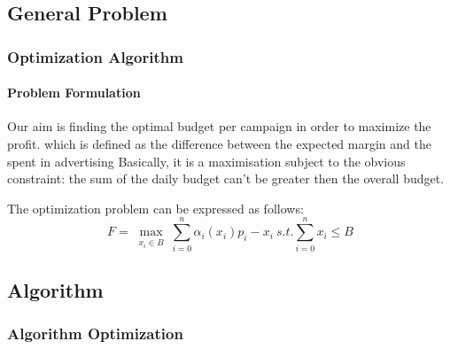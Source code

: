 \documentclass[11pt]{beamer}
\begin{document}

\subsection{General Problem}


\begin{frame}

\frametitle{Optimization Algorithm}
\framesubtitle{Problem Formulation}


Our aim is finding the optimal budget per campaign in order to maximize the profit.
which is defined as the difference between the expected margin and the spent in advertising
Basically, it is a maximisation subject to the obvious constraint: the sum of the daily budget can't be greater then the overall budget.

The optimization problem can be expressed as follows:
\begin{displaymath}
F=\max_{\substack{x_i\in B}} \sum_{i=0}^n \alpha_i(x_i)p_i-x_i \ s.t. \sum_{i=0}^n x_i\leq B
\end{displaymath}

\end{frame}


\subsection{Algorithm}


\begin{frame}

\frametitle{}
\framesubtitle{}

\end{frame}


\begin{frame}

\frametitle{Algorithm Optimization}
\framesubtitle{}

\end{frame}



\end{document}
